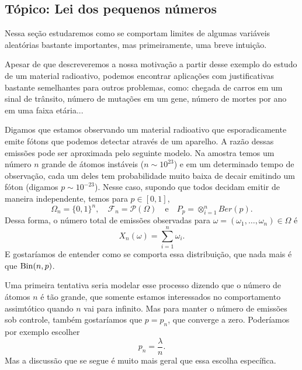 \begin{topics}

\section{Tópico: Lei dos pequenos números}

Nessa seção estudaremos como se comportam limites de algumas variáveis aleatórias bastante importantes, mas primeiramente, uma breve intuição.

Apesar de que descreveremos a nossa motivação a partir desse exemplo do estudo de um material radioativo, podemos encontrar aplicações com justificativas bastante semelhantes para outros problemas, como: chegada de carros em um sinal de trânsito, número de mutações em um gene, número de mortes por ano em uma faixa etária...

Digamos que estamos observando um material radioativo que esporadicamente emite fótons que podemos detectar através de um aparelho.
A razão dessas emissões pode ser aproximada pelo seguinte modelo.
Na amostra temos um número $n$ grande de átomos instáveis ($n \sim 10^{23}$) e em um determinado tempo de observação, cada um deles tem probabilidade muito baixa de decair emitindo um fóton (digamos $p \sim 10^{-23}$).
Nesse caso, supondo que todos decidam emitir de maneira independente, temos para $p \in [0,1]$,
\begin{equation}
  \label{e:Poisson_setup}
  \Omega_n = \{0,1\}^n, \quad \mathcal{F}_n = \mathcal{P}(\Omega) \quad \text{e} \quad P_p = \otimes_{i=1}^n Ber(p).
\end{equation}
Dessa forma, o número total de emissões observadas para $\omega = (\omega_1, \dots, \omega_n) \in \Omega$ é
\begin{equation}
  \label{e:Xn_Poisson}
  X_n(\omega) = \sum_{i=1}^n \omega_i.
\end{equation}
E gostaríamos de entender como se comporta essa distribuição, que nada mais é que $\operatorname{Bin}(n,p)$.

Uma primeira tentativa seria modelar esse processo dizendo que o número de átomos $n$ é tão grande, que somente estamos interessados no comportamento assimtótico quando $n$ vai para infinito.
Mas para manter o número de emissões sob controle, também gostaríamos que $p = p_n$, que converge a zero.
Poderíamos por exemplo escolher
\begin{equation}
  p_n = \frac \lambda n.
\end{equation}
Mas a discussão que se segue é muito mais geral que essa escolha específica.


\end{topics}
